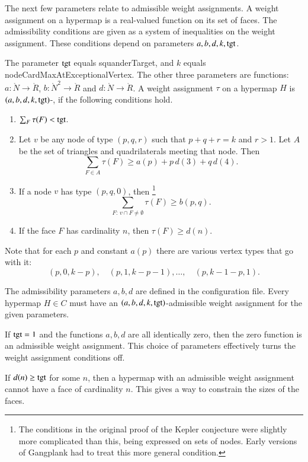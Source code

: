 The next few parameters relate to admissible weight assignments.  A
weight assignment on a hypermap is a real-valued function on its set
of faces.  The admissibility conditions are given as a system of
inequalities on the weight assignment.  These conditions depend on parameters
$a,b,d,k,{\operatorname{tgt}}$.

The parameter ${\operatorname{tgt}}$ equals squanderTarget, and $k$ equals 
nodeCardMaxAtExceptionalVertex.  The other three parameters are functions:
$a:\ring{N}\to\ring{R}$, $b:\ring{N}^2\to \ring{R}$ and $d:\ring{N}\to\ring{R}$.
A weight assignment $\tau$ on a hypermap $H$
is $(a,b,d,k,{\operatorname{tgt}})$-, if the following
conditions hold.
\begin{enumerate}
\item {} $\sum_F \tau(F) < {\operatorname{tgt}}$.
\item {} 
Let $v$ be any node of type $(p,q,r)$ such that $p+q+r=k$ and $r>1$. Let
  $A$ be the set of triangles and quadrilaterals meeting that node.  Then
\[ \sum_{F\in A} \tau(F)
\ge  a(p) + p\, d(3) + q\, d(4).\] 
\item {}
 If a node $v$ has type $(p,q,0)$, then%
\footnote{The conditions in the original proof of the Kepler conjecture were slightly
more complicated than this, being expressed on  sets of nodes.  Early versions of Gangplank had to treat this more general condition.}
  \[ \sum_{F:\,v\cap F\ne\emptyset} \tau(F) \ge
    b(p,q).\] 
\item {}
 If the face $F$ has cardinality $n$, then
$\tau(F) \ge d(n)$.
\end{enumerate}
Note that for each $p$ and constant $a(p)$ there are various vertex types that go with it:
\[
(p,0,k-p),\quad (p,1,k-p-1),\ldots,\quad (p,k-1-p,1).
\]


The admissibility parameters $a,b,d$ are defined in the configuration
file.  Every hypermap $H\in C$ must have an
$(a,b,d,k,{\operatorname{tgt}})$-admissible weight assignment for the
given parameters.

\begin{example}  If ${\operatorname{tgt}}=1$ and the functions $a,b,d$ are all identically zero,
then the zero function is an admissible weight assignment.  This choice of parameters
effectively 
turns the weight assignment conditions off.
\end{example}

\begin{example} If  $d(n)\ge{\operatorname{tgt}}$ for some $n$, then a hypermap with
an admissible weight assignment cannot have a face of cardinality $n$.  This gives
a way to constrain the sizes of the faces.
\end{example}


